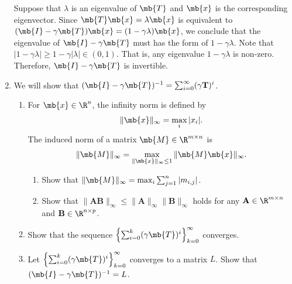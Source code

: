 \begin{exercise}
\begin{enumerate}
            \begin{solution}
                Suppose that $\lambda$ is an eigenvalue of $\mb{T}$ and $\mb{x}$ is the corresponding eigenvector. Since $\mb{T}\mb{x}=\lambda\mb{x}$ is equivalent to $(\mb{I}-\gamma \mb{T})\mb{x}= (1-\gamma\lambda)\mb{x}$, we conclude that the eigenvalue of $\mb{I}-\gamma \mb{T}$ must has the form of $1-\gamma\lambda$. Note that $|1-\gamma\lambda| \ge 1-\gamma|\lambda| \in (0,1)$. That is, any eigenvalue $1-\gamma\lambda$ is non-zero. Therefore, $\mb{I}-\gamma \mb{T}$ is invertible.
                \qedhere
            \end{solution}
        \item
            We will show that $(\mb{I}-\gamma \mb{T})^{-1}=\sum_{i=0}^\infty(\gamma \textbf{T})^i$.
            \begin{enumerate}
                \item For $\mb{x}\in\R^n$, the infinity norm is defined by
                    \begin{align*}
                        \|\mb{x}\|_{\infty}=\max_{i}|x_i|.
                    \end{align*}
                    The induced norm of a matrix $\mb{M}\in\R^{m\times n}$ is
                    \begin{align*}
                        \|\mb{M}\|_{\infty}=\max_{\|\mb{x}\|_{\infty}\leq 1}\|\mb{M}\mb{x}\|_{\infty}.
                    \end{align*}
                    \begin{enumerate}
                        \item
                            Show that $\|\mb{M}\|_{\infty}=\max_{i}\sum_{j=1}^n|m_{i,j}|$.
                        \item
                            Show that $\|\textbf{AB}\|_{\infty}\leq\|\textbf{A}\|_{\infty}\|\textbf{B}\|_{\infty}$ holds for any $\textbf{A}\in\R^{m\times n}$ and $\textbf{B}\in\R^{n\times p}$.
                    \end{enumerate}
                \item
                    Show that the sequence $\left\{\sum_{i=0}^k (\gamma \mb{T})^i\right\}_{k=0}^\infty$ converges.
                \item
                    Let $\left\{\sum_{i=0}^k (\gamma \mb{T})^i\right\}_{k=0}^\infty$ converges to a matrix $L$.
                    Show that $(\mb{I}-\gamma \mb{T})^{-1}=L$.
            \end{enumerate}


\end{enumerate}
\end{exercise}
